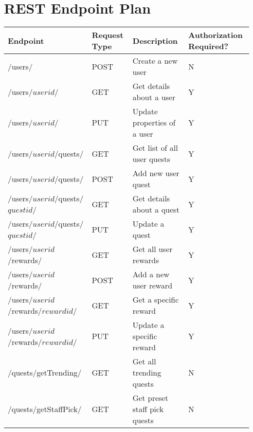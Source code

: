 \chapter{REST Endpoint Plan}
\label{appendix:endpoints}

\begin{tabular}{|l|p{1.5cm}|l|p{2.1cm}|}
	\hline
	Endpoint & Request Type & Description & Authorization Required? \\ \hline
	/users/ & POST & Create a new user & N \\ \hline
	/users/$userid$/ & GET & Get details about a user & Y \\ \hline
	/users/$userid$/ & PUT & Update properties of a user & Y \\ \hline
	/users/$userid$/quests/ & GET & Get list of all user quests & Y \\ \hline
	/users/$userid$/quests/ & POST & Add new user quest & Y \\ \hline
	/users/$userid$/quests/$questid$/ & GET & Get details about a quest & Y \\ \hline
	/users/$userid$/quests/$questid$/ & PUT & Update a quest & Y \\ \hline
	/users/$userid$/rewards/ & GET & Get all user rewards & Y \\ \hline
	/users/$userid$/rewards/ & POST & Add a new user reward & Y \\ \hline
	/users/$userid$/rewards/$rewardid$/ & GET & Get a specific reward & Y \\ \hline
	/users/$userid$/rewards/$rewardid$/ & PUT & Update a specific reward & Y \\ \hline
	/quests/getTrending/ & GET & Get all trending quests & N \\ \hline
	/quests/getStaffPick/ & GET & Get preset staff pick quests & N \\ \hline
\end{tabular}